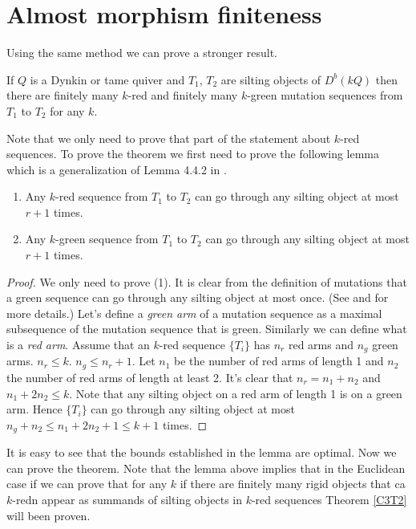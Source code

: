 \section{Almost morphism finiteness}
\indent Using the same method we can prove a stronger result.
\begin{theorem}\label{C3T2}
If $Q$ is a Dynkin or tame quiver and $T_1$, $T_2$ are silting objects of $D^b(kQ)$ then there are finitely many $k$-red and finitely many $k$-green mutation sequences from $T_1$ to $T_2$ for any $k$.
\end{theorem}
\indent Note that we only need to prove that part of the statement about $k$-red sequences. To prove the theorem we first need to prove the following lemma which is a generalization of Lemma 4.4.2 in \cite{BHIT15}.
\begin{lemma}\label{C3L4}
\begin{enumerate}
\item Any $k$-red sequence from $T_1$ to $T_2$ can go through any silting object at most $r+1$ times.
\item Any $k$-green sequence from $T_1$ to $T_2$ can go through any silting object at most $r+1$ times.
\end{enumerate}
\end{lemma}
\begin{proof}
We only need to prove (1). It is clear from the definition of mutations that a green sequence can go through any silting object at most once. (See \cite{BY13} and \cite{KY12} for more details.) Let's define a \textit{green arm} of a mutation sequence as a maximal subsequence of the mutation sequence that is green. Similarly we can define what is a \textit{red arm}. Assume that an $k$-red sequence $\{T_i\}$ has $n_r$ red arms and $n_g$ green arms. $n_r\leq k$. $n_g\leq n_r+1$. Let $n_1$ be the number of red arms of length 1 and $n_2$ the number of red arms of length at least 2. It's clear that $n_r=n_1+n_2$ and $n_1+2n_2\leq k$. Note that any silting object on a red arm of length 1 is on a green arm. Hence $\{T_i\}$ can go through any silting object at most $n_g+n_2\leq n_1+2n_2+1\leq k+1$ times.
\end{proof}
\indent It is easy to see that the bounds established in the lemma are optimal. Now we can prove the theorem. Note that the lemma above implies that in the Euclidean case if we can prove that for any $k$ if there are finitely many rigid objects that ca$k$-redn appear as summands of silting objects in $k$-red sequences Theorem \ref{C3T2} will been proven. 
